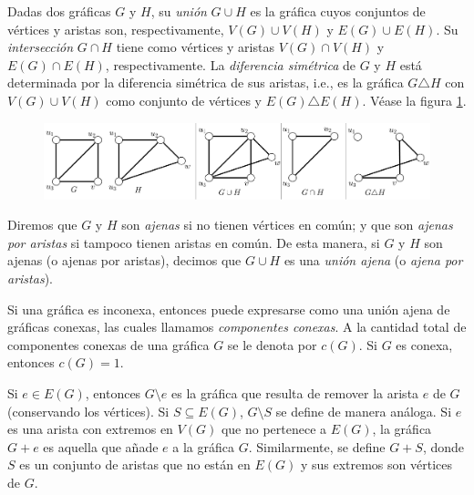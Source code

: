 Dadas dos gráficas $G$ y $H$, su \textit{unión} $G \cup H$ es la gráfica cuyos conjuntos de vértices y aristas son, respectivamente, $V(G) \cup V(H)$ y $E(G) \cup E(H)$. Su \textit{intersección} $G \cap H$ tiene como vértices y aristas $V(G) \cap V(H)$ y $E(G) \cap E(H)$, respectivamente. La \textit{diferencia simétrica} de $G$ y $H$ está determinada por la diferencia simétrica de sus aristas, i.e., es la gráfica $G \triangle H$ con $V(G) \cup V(H)$ como conjunto de vértices y $E(G)\triangle E(H)$. Véase la figura \ref{fig:operaciones}.

\begin{figure}[H]
    \centering
    \includegraphics[scale=0.18]{img/imgchapter1/Operaciones.jpg}
    \caption{}
    \label{fig:operaciones}
\end{figure}

Diremos que $G$ y $H$ son \textit{ajenas}  si no tienen vértices en común; y que son \textit{ajenas por aristas} si tampoco tienen aristas en común. De esta manera, si $G$ y $H$ son ajenas (o ajenas por aristas), decimos que $G \cup H$ es una \textit{unión ajena} (o \textit{ajena por aristas}). 

Si una gráfica es inconexa, entonces puede expresarse como una unión ajena de gráficas conexas, las cuales llamamos \textit{componentes conexas}. A la cantidad total de componentes conexas de una gráfica $G$ se le denota por $c(G)$. Si $G$ es conexa, entonces $c(G)=1$.

Si $e \in E(G)$, entonces $G\setminus e$ es la gráfica que resulta de remover la arista $e$ de $G$ (conservando los vértices). Si $S\subseteq E(G)$, $G\setminus S$ se define de manera análoga. Si $e$ es una arista con extremos en $V(G)$ que no pertenece a $E(G)$, la gráfica $G+e$ es aquella que añade $e$ a la gráfica $G$. Similarmente, se define $G + S$, donde $S$ es un conjunto de aristas que no están en $E(G)$ y sus extremos son vértices de $G$.


